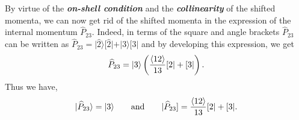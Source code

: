 By virtue of the \textbf{\emph{on-shell condition}} and the \textbf{\emph{collinearity}} of the shifted momenta, we can now get rid of the shifted momenta in the expression of the internal momentum $\widehat{P}_{23}$. Indeed, in terms of the square and angle brackets $\widehat{P}_{23}$ can be written as $\widehat{P}_{23}=\vert \hat{2} \rangle [\hat{2} \vert +\vert 3 \rangle [3\vert$ and by developing this expression, we get
\begin{equation}
\widehat{P}_{23}=\vert 3 \rangle \left( \frac{\langle12\rangle}{13} [2\vert +[3\vert \right).
\end{equation}
Thus we have,
\begin{equation}
\vert \widehat{P}_{23} \rangle =\vert 3 \rangle \qquad \text{and} \qquad \vert \widehat{P}_{23}]=\frac{\langle12\rangle}{13} [2\vert +[3\vert .
\end{equation}

